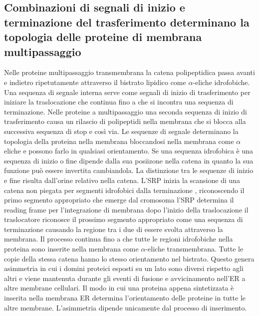 \subsection{Combinazioni di segnali di inizio e terminazione del trasferimento determinano la topologia delle proteine di membrana multipassaggio}
Nelle proteine multipassaggio transmembrana la catena polipeptidica passa avanti e indietro ripetutamente attraverso il bistrato lipidico come $\alpha$-eliche idrofobiche. Una sequenza
di segnale interna serve come segnali di inizio di trasferimento per iniziare la traslocazione che continua fino a che si incontra una sequenza di terminazione. Nelle proteine a 
multipassaggio una seconda sequenza di inizio di trasferimento causa un rilascio di polipeptidi nella membrana che si blocca alla successiva sequenza di stop e cos\`i via. Le sequenze
di segnale determinano la topologia della proteina nella membrana bloccandosi nella membrana come $\alpha$ eliche e possono farlo in qualsiasi orientamento. Se una sequenza idrofobica
\`e una sequenza di inizio o fine dipende dalla sua posiizone nella catena in quanto la sua funzione pu\`o essere invertita cambiandola. La distinzione tra le sequenze di inizio e fine
risulta dall'orine relativo nella catena. L'SRP inizia la scansione di una catena non piegata per segmenti idrofobici dalla terminazione , riconoscendo il primo segmento 
appropriato che emerge dal cromosoma l'SRP determina il reading frame per l'integrazione di membrana dopo l'inizio della traslocazione il traslocatore riconosce il prossimo segmento
appropriato come una sequenza di terminazione causando la regione tra i due di essere svolta attraverso la membrana. Il processo continua fino a che tutte le regioni idrofobiche nella
proteina sono inserite nella membrana come $\alpha$-eliche transmembrana. Tutte le copie della stessa catena hanno lo stesso orientamento nel bistrato. Questo genera asimmetria in cui
i domini proteici esposti su un lato sono diversi rispetto agli altri e viene mantenuta durante gli eventi di fusione e avvicinamento nell'ER a altre membrane cellulari. Il modo in 
cui una proteina appena sintetizzata \`e inserita nella membrana ER determina l'orientamento delle proteine in tutte le altre membrane. L'asimmetria dipende unicamente dal processo di
inserimento.
